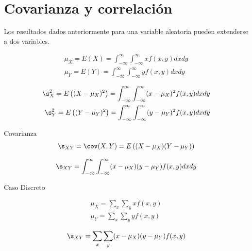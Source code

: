 \section{Covarianza y correlación}

Los resultados dados anteriormente para una variable aleatoria pueden extenderse a dos variables.


{}

\begin{equation}
 \label{eq:3.43}
 \begin{split}
  \mu_{X}=E(X)=\int_{-\infty}^{\infty}\int_{-\infty}^{\infty} xf(x,y)dxdy\\ 
  \mu_{Y}=E(Y)=\int_{-\infty}^{\infty}\int_{-\infty}^{\infty}
  yf(x,y)dxdy
 \end{split}
\end{equation}





\begin{equation}
 \label{eq:3.44}
 \begin{split}
  \s^{2}_{X}=E\left( (X-\mu_{X})^{2} \right)=\int_{-\infty}^{\infty}\int_{-\infty}^{\infty} (x-\mu_{X})^2f(x,y)dxdy\\ 
  \s^{2}_{Y}=E\left( (Y-\mu_{Y})^{2} \right)=\int_{-\infty}^{\infty}\int_{-\infty}^{\infty} (y-\mu_{Y})^2f(x,y)dxdy
 \end{split}
\end{equation}


{Covarianza}
 \begin{align}
 \label{eq:3.45}
  \s_{XY}=\cov(X,Y)=E\left( (X-\mu_{X})(Y-\mu_{Y}) \right)
 \end{align}



 \begin{align}
  \label{eq:3.46}
  \s_{XY}=\int_{-\infty}^{\infty}
  \int_{-\infty}^{\infty}
  (x-\mu_{X})(y-\mu_{Y})f(x,y)dxdy
 \end{align}


{Caso Discreto}

 \begin{equation}
  \begin{split}
   \mu_{X}=\sum_{x}\sum_{y}xf(x,y) \\
  \mu_{Y}=\sum_{x}\sum_{y}yf(x,y)
  \end{split}
 \end{equation}



 \begin{align}
  \label{eq:3.48}
  \s_{XY}=\sum_{x}\sum_{y}(x-\mu_{X})(y-\mu_{Y})f(x,y)
 \end{align}



